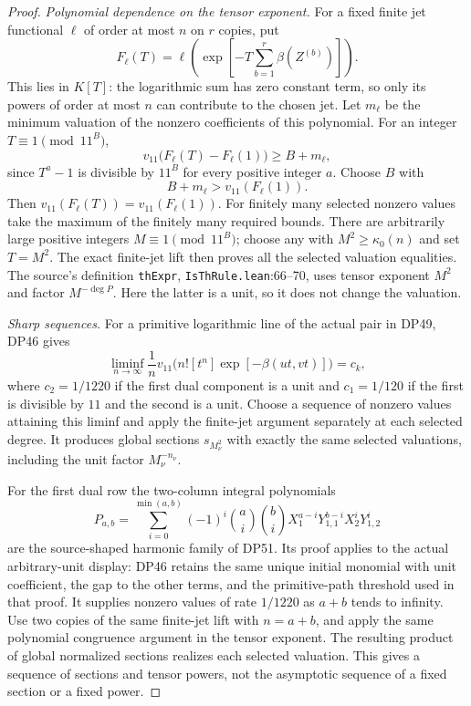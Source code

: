 \documentclass[11pt,a4paper]{article}
\theoremstyle{definition}\newtheorem{remark}[theorem]{Remark}
\begin{document}
\begin{proof}
\emph{Polynomial dependence on the tensor exponent.}
For a fixed finite jet functional $\ell$ of order at most $n$ on $r$ copies, put
\[
 F_\ell(T)=\ell\left(
 \exp\left[-T\sum_{b=1}^r\beta(Z^{(b)})\right]\right).
\]
This lies in $K[T]$: the logarithmic sum has zero constant term, so only its powers of order at most $n$ can contribute to the chosen jet.
Let $m_\ell$ be the minimum valuation of the nonzero coefficients of this polynomial. For an integer $T\equiv1\pmod{11^B}$,
\[
 v_{11}\bigl(F_\ell(T)-F_\ell(1)\bigr)\ge B+m_\ell,
\]
since $T^a-1$ is divisible by $11^B$ for every positive integer $a$.
Choose $B$ with
\[
 B+m_\ell>v_{11}(F_\ell(1)).
\]
Then $v_{11}(F_\ell(T))=v_{11}(F_\ell(1))$.
For finitely many selected nonzero values take the maximum of the finitely many required bounds.
There are arbitrarily large positive integers $M\equiv1\pmod{11^B}$; choose any with $M^2\ge\kappa_0(n)$ and set $T=M^2$.
The exact finite-jet lift then proves all the selected valuation equalities.
The source's definition \texttt{thExpr}, \texttt{IsThRule.lean}:66--70, uses tensor exponent $M^2$ and factor $M^{-\deg P}$. Here the latter is a unit, so it does not change the valuation.

\emph{Sharp sequences.}
For a primitive logarithmic line of the actual pair in DP49, DP46 gives
\[
 \liminf_{n\longrightarrow\infty}
 \frac1n v_{11}\bigl(n![t^n]\exp[-\beta(ut,vt)]\bigr)
 =c_k,
\]
where $c_2=1/1220$ if the first dual component is a unit and $c_1=1/120$ if the first is divisible by $11$ and the second is a unit.
Choose a sequence of nonzero values attaining this liminf and apply the finite-jet argument separately at each selected degree.
It produces global sections $s_{M_\nu^2}$ with exactly the same selected valuations, including the unit factor $M_\nu^{-n_\nu}$.

For the first dual row the two-column integral polynomials
\[
 P_{a,b}=\sum_{i=0}^{\min(a,b)}(-1)^i
 \binom ai\binom bi
 X_1^{a-i}Y_{1,1}^{b-i}X_2^iY_{1,2}^i
\]
are the source-shaped harmonic family of DP51.
Its proof applies to the actual arbitrary-unit display: DP46 retains the same unique initial monomial with unit coefficient, the gap to the other terms, and the primitive-path threshold used in that proof.
It supplies nonzero values of rate $1/1220$ as $a+b$ tends to infinity. Use two copies of the same finite-jet lift with $n=a+b$, and apply the same polynomial congruence argument in the tensor exponent. The resulting product of global normalized sections realizes each selected valuation.
This gives a sequence of sections and tensor powers, not the asymptotic sequence of a fixed section or a fixed power.


\end{proof}
\end{document}

